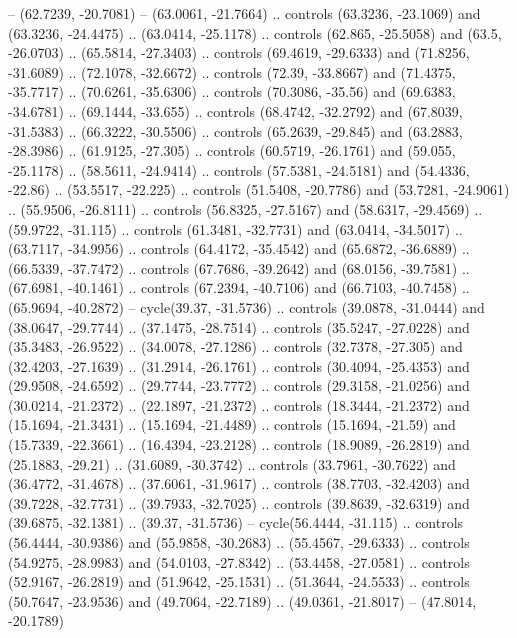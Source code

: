 {    -- (62.7239, -20.7081)
    -- (63.0061, -21.7664)
    .. controls (63.3236, -23.1069) and (63.3236, -24.4475) .. (63.0414, -25.1178)
    .. controls (62.865, -25.5058) and (63.5, -26.0703) .. (65.5814, -27.3403)
    .. controls (69.4619, -29.6333) and (71.8256, -31.6089) .. (72.1078, -32.6672)
    .. controls (72.39, -33.8667) and (71.4375, -35.7717) .. (70.6261, -35.6306)
    .. controls (70.3086, -35.56) and (69.6383, -34.6781) .. (69.1444, -33.655)
    .. controls (68.4742, -32.2792) and (67.8039, -31.5383) .. (66.3222, -30.5506)
    .. controls (65.2639, -29.845) and (63.2883, -28.3986) .. (61.9125, -27.305)
    .. controls (60.5719, -26.1761) and (59.055, -25.1178) .. (58.5611, -24.9414)
    .. controls (57.5381, -24.5181) and (54.4336, -22.86) .. (53.5517, -22.225)
    .. controls (51.5408, -20.7786) and (53.7281, -24.9061) .. (55.9506, -26.8111)
    .. controls (56.8325, -27.5167) and (58.6317, -29.4569) .. (59.9722, -31.115)
    .. controls (61.3481, -32.7731) and (63.0414, -34.5017) .. (63.7117, -34.9956)
    .. controls (64.4172, -35.4542) and (65.6872, -36.6889) .. (66.5339, -37.7472)
    .. controls (67.7686, -39.2642) and (68.0156, -39.7581) .. (67.6981, -40.1461)
    .. controls (67.2394, -40.7106) and (66.7103, -40.7458) .. (65.9694, -40.2872)
    -- cycle(39.37, -31.5736)
    .. controls (39.0878, -31.0444) and (38.0647, -29.7744) .. (37.1475, -28.7514)
    .. controls (35.5247, -27.0228) and (35.3483, -26.9522) .. (34.0078, -27.1286)
    .. controls (32.7378, -27.305) and (32.4203, -27.1639) .. (31.2914, -26.1761)
    .. controls (30.4094, -25.4353) and (29.9508, -24.6592) .. (29.7744, -23.7772)
    .. controls (29.3158, -21.0256) and (30.0214, -21.2372) .. (22.1897, -21.2372)
    .. controls (18.3444, -21.2372) and (15.1694, -21.3431) .. (15.1694, -21.4489)
    .. controls (15.1694, -21.59) and (15.7339, -22.3661) .. (16.4394, -23.2128)
    .. controls (18.9089, -26.2819) and (25.1883, -29.21) .. (31.6089, -30.3742)
    .. controls (33.7961, -30.7622) and (36.4772, -31.4678) .. (37.6061, -31.9617)
    .. controls (38.7703, -32.4203) and (39.7228, -32.7731) .. (39.7933, -32.7025)
    .. controls (39.8639, -32.6319) and (39.6875, -32.1381) .. (39.37, -31.5736)
    -- cycle(56.4444, -31.115)
    .. controls (56.4444, -30.9386) and (55.9858, -30.2683) .. (55.4567, -29.6333)
    .. controls (54.9275, -28.9983) and (54.0103, -27.8342) .. (53.4458, -27.0581)
    .. controls (52.9167, -26.2819) and (51.9642, -25.1531) .. (51.3644, -24.5533)
    .. controls (50.7647, -23.9536) and (49.7064, -22.7189) .. (49.0361, -21.8017)
    -- (47.8014, -20.1789)
}
